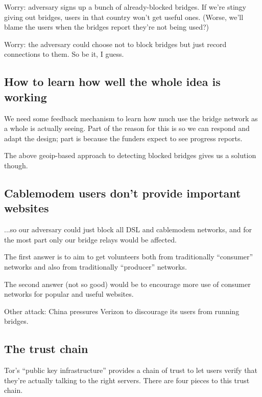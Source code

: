\documentclass{llncs}
\begin{document}
Worry: adversary signs up a bunch of already-blocked bridges. If we're
stingy giving out bridges, users in that country won't get useful ones.
(Worse, we'll blame the users when the bridges report they're not
being used?)

Worry: the adversary could choose not to block bridges but just record
connections to them. So be it, I guess.

\subsection{How to learn how well the whole idea is working}

We need some feedback mechanism to learn how much use the bridge network
as a whole is actually seeing. Part of the reason for this is so we can
respond and adapt the design; part is because the funders expect to see
progress reports.

The above geoip-based approach to detecting blocked bridges gives us a
solution though.

\subsection{Cablemodem users don't provide important websites}
\label{subsec:block-cable}

...so our adversary could just block all DSL and cablemodem networks,
and for the most part only our bridge relays would be affected.

The first answer is to aim to get volunteers both from traditionally
``consumer'' networks and also from traditionally ``producer'' networks.

The second answer (not so good) would be to encourage more use of consumer
networks for popular and useful websites.

Other attack: China pressures Verizon to discourage its users from
running bridges.

\subsection{The trust chain}
\label{subsec:trust-chain}

Tor's ``public key infrastructure'' provides a chain of trust to
let users verify that they're actually talking to the right servers.
There are four pieces to this trust chain.
\end{document}

